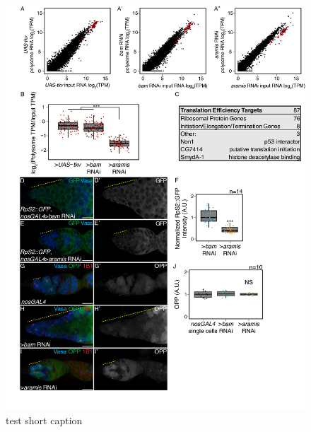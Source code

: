 \documentclass[12pt,oneside]{reedthesis}
\begin{document}
\begin{figure}

{\centering \includegraphics[width=6.5 in,height=8.9375 in]{./figure/Ribosome Biogenesis/Ribosome Biogenesis 4} 

}

\caption[test short caption]{test short caption}\label{fig:unnamed-chunk-12}
\end{figure}
\end{document}

